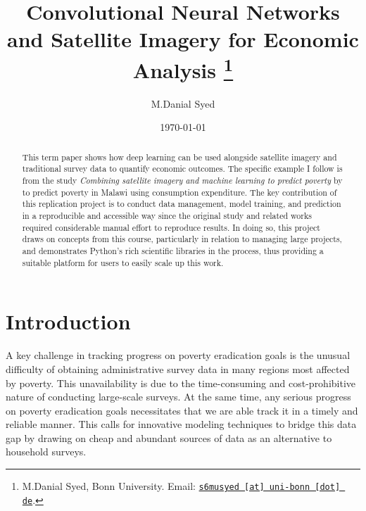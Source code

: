 \documentclass[11pt, a4paper, leqno]{article}
\begin{document}
\title{Convolutional Neural Networks and Satellite Imagery for Economic Analysis \thanks{M.Danial Syed, Bonn University. Email: \href{mailto:s6musyed@uni-bonn.de}{\nolinkurl{s6musyed [at] uni-bonn [dot] de}}.}}

\author{M.Danial Syed}

\date{
    \today
}

\maketitle


\begin{abstract}
 This term paper shows how deep learning can be used alongside satellite imagery and traditional survey data to quantify economic outcomes. The specific example I follow is from the study \textit{Combining satellite imagery and machine learning to predict poverty} by \citet{jean2016combining} to predict poverty in Malawi using consumption expenditure. The key contribution of this replication project is to conduct data management, model training, and prediction in a reproducible and accessible way since the original study and related works required considerable manual effort to reproduce results. In doing so, this project draws on concepts from this course, particularly in relation to managing large projects, and demonstrates Python's rich scientific libraries in the process, thus providing a suitable platform for users to easily scale up this work.
\end{abstract}

\clearpage


\section{Introduction} %
\label{sec:introduction}

A key challenge in tracking progress on poverty eradication goals is the unusual difficulty of obtaining administrative survey data in many regions most affected by poverty. This unavailability is due to the time-consuming and cost-prohibitive nature of conducting large-scale surveys. At the same time, any serious progress on poverty eradication goals necessitates that we are able track it in a timely and reliable manner. This calls for innovative modeling techniques to bridge this data gap by drawing on cheap and abundant sources of data as an alternative to household surveys.
\end{document}

